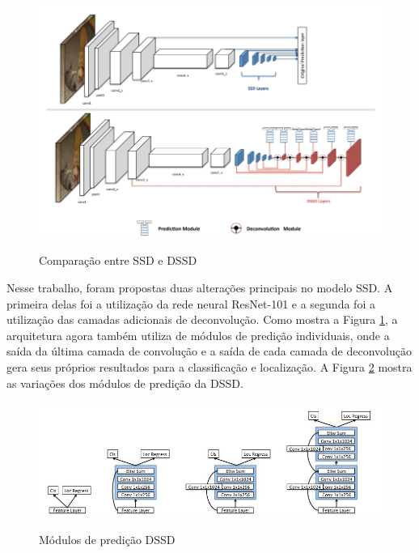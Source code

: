 \begin{figure}[H]
	\setlength{\abovecaptionskip}{0pt}
	\setlength{\belowcaptionskip}{0pt}
	\caption[SSD e DSSD]{Comparação entre \ac{SSD} e \ac{DSSD}}
	\centering
	\includegraphics[width=.8\textwidth]{imagem/0x_comparacao_ssd_dssd.png}
	\captionsetup{justification=centering}
	\label{fig:ssdxdssd}
\end{figure}

Nesse trabalho, foram propostas duas alterações principais no modelo \ac{SSD}. A primeira delas foi a utilização da rede neural ResNet-101  e a segunda foi a utilização das camadas adicionais de deconvolução. Como mostra a Figura \ref{fig:ssdxdssd}, a arquitetura agora também utiliza de módulos de predição individuais, onde a saída da última camada de convolução e a saída de cada camada de deconvolução gera seus próprios resultados para a classificação e localização. A Figura \ref{fig:dssdpred} mostra as variações dos módulos de predição da \ac{DSSD}.

\begin{figure}[H]
	\setlength{\abovecaptionskip}{0pt}
	\setlength{\belowcaptionskip}{0pt}
	\caption[Módulos de predição DSSD]{Módulos de predição \ac{DSSD}}
	\centering
	\includegraphics[width=.8\textwidth]{imagem/0x_dssdpredmod.jpg}
	\captionsetup{justification=centering}
	\label{fig:dssdpred}
\end{figure}

